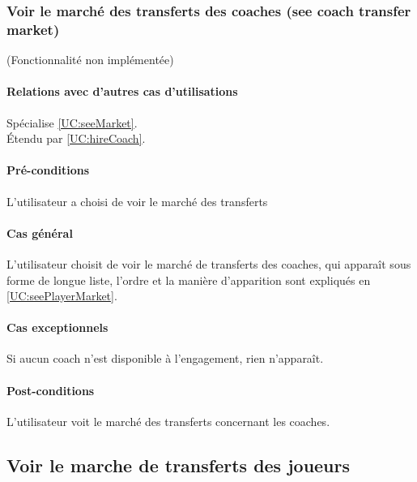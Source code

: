 \subsubsection{Voir le marché des transferts des coaches (see coach transfer market)}
\label{UC:seeCoachMarket}
(Fonctionnalité non implémentée)
\paragraph{Relations avec d'autres cas d'utilisations}
Spécialise \ref{UC:seeMarket}.\\
Étendu par \ref{UC:hireCoach}.
\paragraph{Pré-conditions}
\begin{list}{}{\leftmargin=1.5em}
\item{L'utilisateur a choisi de voir le marché des transferts}
\end{list}
\paragraph{Cas général}
L'utilisateur choisit de voir le marché de transferts des coaches, qui apparaît sous forme de longue liste, l'ordre et la manière d'apparition sont expliqués en \ref{UC:seePlayerMarket}.
\paragraph{Cas exceptionnels}
Si aucun coach n'est disponible à l'engagement, rien n'apparaît.
\paragraph{Post-conditions}
\begin{list}{}{\leftmargin=1.5em}
\item{L'utilisateur voit le marché des transferts concernant les coaches. }
\end{list}

\subsection{Voir le marche de transferts des joueurs}

